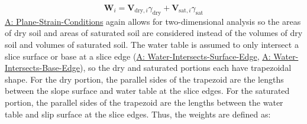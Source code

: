 \documentclass[12pt]{article}
\begin{document}
\begin{displaymath}
{\mathbf{W}}_{i}={\mathbf{V}_{\text{dry},i}} {γ_{\text{dry}}}+{\mathbf{V}_{\text{sat},i}} {γ_{\text{sat}}}
\end{displaymath}
\hyperref[assumpPSC]{A: Plane-Strain-Conditions} again allows for two-dimensional analysis so the areas of dry soil and areas of saturated soil are considered instead of the volumes of dry soil and volumes of saturated soil. The water table is assumed to only intersect a slice surface or base at a slice edge (\hyperref[assumpWISE]{A: Water-Intersects-Surface-Edge}, \hyperref[assumpWIBE]{A: Water-Intersects-Base-Edge}), so the dry and saturated portions each have trapezoidal shape. For the dry portion, the parallel sides of the trapezoid are the lengths between the slope surface and water table at the slice edges. For the saturated portion, the parallel sides of the trapezoid are the lengths between the water table and slip surface at the slice edges. Thus, the weights are defined as:
\end{document}
